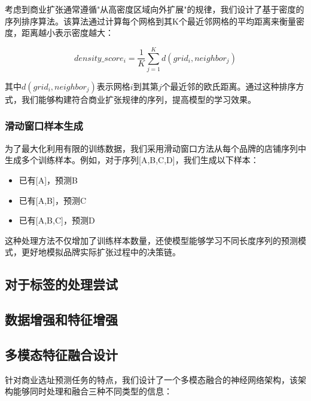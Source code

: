 \documentclass{article}
\begin{document}
考虑到商业扩张通常遵循"从高密度区域向外扩展"的规律，我们设计了基于密度的序列排序算法。该算法通过计算每个网格到其K个最近邻网格的平均距离来衡量密度，距离越小表示密度越大：

\begin{equation}
density\_score_i = \frac{1}{K}\sum_{j=1}^{K} d(grid_i, neighbor_j)
\end{equation}

其中$d(grid_i, neighbor_j)$表示网格$i$到其第$j$个最近邻的欧氏距离。通过这种排序方式，我们能够构建符合商业扩张规律的序列，提高模型的学习效果。

\subsubsection{滑动窗口样本生成}

为了最大化利用有限的训练数据，我们采用滑动窗口方法从每个品牌的店铺序列中生成多个训练样本。例如，对于序列[A,B,C,D]，我们生成以下样本：
\begin{itemize}
\item 已有[A]，预测B
\item 已有[A,B]，预测C  
\item 已有[A,B,C]，预测D
\end{itemize}

这种处理方法不仅增加了训练样本数量，还使模型能够学习不同长度序列的预测模式，更好地模拟品牌实际扩张过程中的决策链。


\subsection{对于标签的处理尝试}


\subsection{数据增强和特征增强}


\subsection{多模态特征融合设计}

针对商业选址预测任务的特点，我们设计了一个多模态融合的神经网络架构，该架构能够同时处理和融合三种不同类型的信息：
\end{document}
